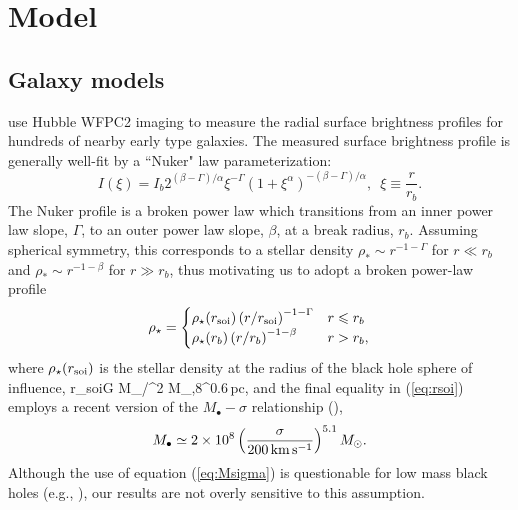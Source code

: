 \documentclass[usenatbib,fleqn]{mn2e}
\newcommand{\rb}{r_b}
\newcommand{\rhostar}{\rho_*}
\newcommand{\Mbh}[1][]{M_{\bullet#1}}
\newcommand{\soi}{\rm soi}
\newcommand{\rsoi}{r_{\soi}}
\begin{document}
\section{Model}
\label{sec:model}
\subsection{Galaxy models}
\citet{LauerFaber+:2007a} use Hubble WFPC2 imaging to measure the
radial surface brightness profiles for hundreds of nearby early type galaxies. The measured surface brightness profile is generally well-fit by a ``Nuker" law parameterization:
\begin{equation}
  I(\xi)=I_b 2^{(\beta-\Gamma)/\alpha} \xi^{-\Gamma} (1+\xi^\alpha)^{-(\beta-\Gamma)/\alpha}, \,\,\,\xi\equiv\frac{r}{r_b}.
\end{equation}
The Nuker profile is a broken power law which transitions from an inner power law slope, $\Gamma$, to an outer power law slope, $\beta$, at a break radius, $\rb$.  Assuming spherical symmetry, this corresponds to a stellar density $\rhostar \sim r^{-1-\Gamma}$ for $r \ll \rb$ and $\rhostar\sim r^{-1-\beta}$ for $r \gg \rb$, thus motivating us to adopt a broken power-law profile
\begin{align}
\rho_\star = 
\begin{cases}
\rho_\star(\rsoi) \left(r/\rsoi\right)^{-1-\Gamma} & r \leq r_b\\
\rho_\star(r_b) \left(r/r_b\right)^{-1-\beta} & r > r_b,
\label{eq:rhostar}
\end{cases}
\end{align}
where $\rho_\star(\rsoi)$ is the stellar density at the radius of the black hole sphere of influence, 
\be
\rsoi \simeq G \Mbh/\sigma^2  M_{\bullet,8}^{0.6}\,{\rm pc},
\label{eq:rsoi}
\ee
and the final equality in (\ref{eq:rsoi}) employs a recent version of the $\Mbh-\sigma$ relationship (\citealt{Gultekin+09}),
 \begin{align}
M_{\bullet} \simeq 2\times 10^{8}\left(\frac{\sigma}{200\,{\rm
      km\,s^{-1}}}\right)^{5.1}M_{\odot}.
\label{eq:Msigma}
\end{align}
Although the use of equation (\ref{eq:Msigma}) is questionable for low mass black holes (e.g., \citealt{Greene&Ho07}), our results are not overly sensitive to this assumption.  
\end{document}
